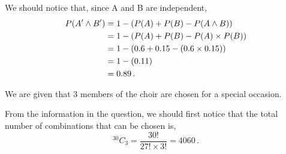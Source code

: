 %
%


\begin{subquestions}
	
\subquestion

We should notice that, since A and B are independent,
\begin{align}
	P(A' \land B') & = 1 - (P(A)+P(B)-P(A \land B)) \nonumber \\
	               & = 1 - (P(A)+P(B)-P(A)\times P(B)) \nonumber \\
	               & = 1 - (0.6+0.15-(0.6\times0.15)) \nonumber \\
	               & = 1 - (0.11) \nonumber \\
	               & = 0.89 \,.
\end{align} 
	

\subquestion

We are given that 3 members of the choir are chosen for a special occasion.

\begin{subsubquestions}
	
\subsubquestion

\begin{subsubsubquestions}
	
\subsubsubquestion

From the information in the question, we should first notice that the total number of combinations that can be chosen is,
\begin{equation}
	^{30}C_3 = \frac{30!}{27! \times 3!} = 4060 \,.
\end{equation}
	

\end{subsubsubquestions}
\end{subsubquestions}
\end{subquestions}

